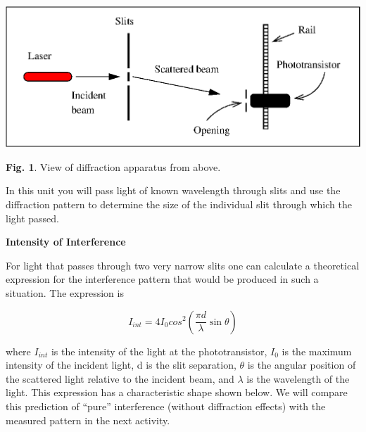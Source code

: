 \vspace{0.3cm}
\begin{center}
\includegraphics{interference_of_light/interference_of_light_fig1b.eps}
\end{center}
\vspace{0.3cm}

{\centering \textbf{Fig. 1}. View of diffraction apparatus from above.\par}

In this unit you will  pass light of known wavelength through slits 
and use the diffraction pattern to determine the size of the individual
slit through which the light passed.

\textbf{Intensity of Interference }

For light that passes through two very narrow slits one can calculate
a theoretical expression for the interference pattern that would be
produced in such a situation. The expression is 

\begin{displaymath} I_{int} = 4I_0 cos^2 (\frac {\pi d} {\lambda} \sin \theta ) \end{displaymath}

where $I_{int}$ is the intensity of the light at the phototransistor,
$I_{0}$ is the maximum intensity of the incident light, d is
the slit separation, \( \theta  \) is the angular position of the
scattered light relative to the incident beam, and \( \lambda  \)
is the wavelength of the light. This expression has a characteristic
shape shown below. We will compare this prediction of {}``pure''
interference (without diffraction effects) with the measured pattern
in the next activity.


